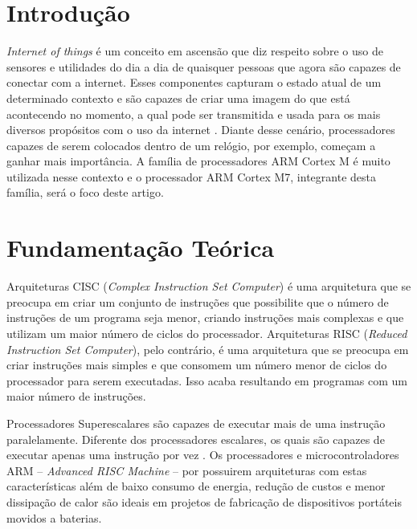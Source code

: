 \documentclass[10pt, a4paper]{article}
\title{\titlefont{\textbf{Estudo do Processador ARM Cortex M7}}}
\author{
  \authorsfont{\textit{Kaliana Dias}}\\
  \and
  \authorsfont{\textit{Rodrigo Chaves}}\\  
}
\date{}
\begin{document}
\maketitle
\section{Introdução}

{\it Internet of things} é um conceito em ascensão que diz respeito sobre o uso de sensores e utilidades do dia a dia de quaisquer pessoas que agora são capazes de conectar com a internet. Esses componentes capturam o estado atual de um determinado contexto e são capazes de criar uma imagem do que está acontecendo no momento, a qual pode ser transmitida e usada para os mais diversos propósitos com o uso da internet \autocite{internet-of-things}. Diante desse cenário, processadores capazes de serem colocados dentro de um relógio, por exemplo, começam a ganhar mais importância.  A família de processadores ARM 
Cortex M é muito utilizada nesse contexto e o processador ARM Cortex M7, 
integrante desta família, será o foco deste artigo.

\section{Fundamentação Teórica}

Arquiteturas CISC ({\it Complex Instruction Set Computer}) é uma arquitetura que se preocupa em criar um conjunto de instruções que possibilite que o número de instruções de um programa seja menor, criando instruções mais complexas e que utilizam um maior número de ciclos do processador.  Arquiteturas RISC ({\it Reduced Instruction Set Computer}), pelo contrário, é uma arquitetura que se preocupa em criar instruções mais simples e que consomem um número menor de ciclos do processador para serem executadas. Isso acaba resultando em programas com um maior número de instruções. 

Processadores Superescalares são capazes de executar mais de uma instrução paralelamente. Diferente dos processadores escalares, os quais são capazes de executar apenas uma instrução por vez \autocite{superscalar-processors}. Os processadores e microcontroladores ARM -- {\it Advanced RISC Machine } -- por possuirem arquiteturas com estas características além de baixo consumo de energia, redução de custos e menor dissipação de calor são ideais em projetos de fabricação de dispositivos portáteis movidos a baterias.  
\end{document}
